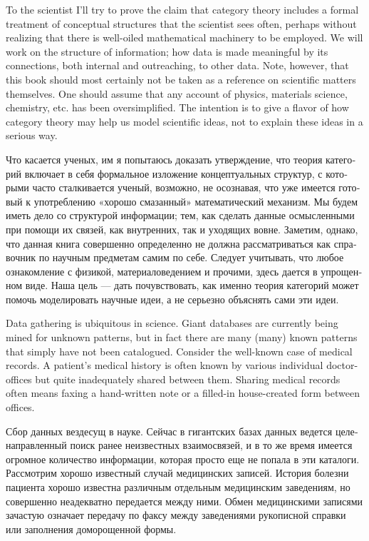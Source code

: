\documentclass[a4paper]{book}
\theoremstyle{myth}
\begin{document}
\begin{russian}
To the scientist I'll try to prove the claim that category theory includes a formal treatment of conceptual structures that the scientist sees often, perhaps without realizing that there is well-oiled mathematical machinery to be employed. We will work on the structure of information; how data is made meaningful by its connections, both internal and outreaching, to other data. Note, however, that this book should most certainly not be taken as a reference on scientific matters themselves. One should assume that any account of physics, materials science, chemistry, etc. has been oversimplified. The intention is to give a flavor of how category theory may help us model scientific ideas, not to explain these ideas in a serious way.

Что касается ученых, им я попытаюсь доказать утверждение, что теория категорий включает в себя формальное изложение концептуальных структур, с которыми часто сталкивается ученый, возможно, не осознавая, что уже имеется готовый к употреблению «хорошо смазанный» математический механизм. Мы будем иметь дело со структурой информации; тем, как сделать данные осмысленными при помощи их связей, как внутренних, так и уходящих вовне. Заметим, однако, что данная книга совершенно определенно не должна рассматриваться как справочник по научным предметам самим по себе. Следует учитывать, что любое ознакомление с физикой, материаловедением и прочими, здесь дается в упрощенном виде. Наша цель — дать почувствовать, как именно теория категорий может помочь моделировать научные идеи, а не серьезно объяснять сами эти идеи. 

Data gathering is ubiquitous in science. Giant databases are currently being mined for unknown patterns, but in fact there are many (many) known patterns that simply have not been catalogued. Consider the well-known case of medical records. A patient's medical history is often known by various individual doctor-offices but quite inadequately shared between them. Sharing medical records often means faxing a hand-written note or a filled-in house-created form between offices.

Сбор данных вездесущ в науке. Сейчас в гигантских базах данных ведется целенаправленный поиск ранее неизвестных взаимосвязей, и в то же время имеется огромное количество информации, которая просто еще не попала в эти каталоги. Рассмотрим хорошо известный случай медицинских записей. История болезни пациента хорошо известна различным отдельным медицинским заведениям, но совершенно неадекватно передается между ними. Обмен медицинскими записями зачастую означает передачу по факсу между заведениями рукописной справки или заполнения доморощенной формы. 


\end{russian}
\end{document}
